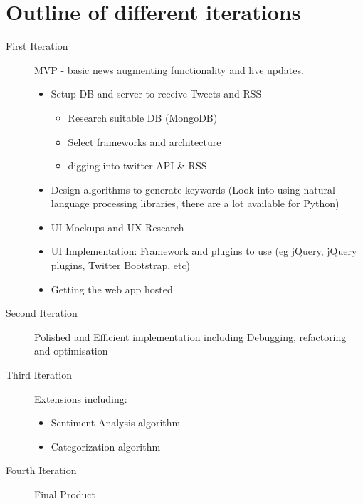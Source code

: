 \documentclass[a4paper,11pt]{article}
\begin{document}
	\section{Outline of different iterations}
	\begin{description}
	  \item[First Iteration] MVP - basic news augmenting functionality and live updates.
	    \begin{itemize}
	      
	      \item Setup DB and server to receive Tweets and RSS
	      
	      \begin{itemize}
	        \item Research suitable DB (MongoDB)
	        \item Select frameworks and architecture
	        \item digging into twitter API \& RSS
	      \end{itemize}
	      
	      \item Design algorithms to generate keywords (Look into using natural language processing libraries, there are a lot available for Python)
	      \item UI Mockups and UX Research
	      \item UI Implementation: Framework and plugins to use (eg jQuery, jQuery plugins, Twitter Bootstrap, etc)
	      \item Getting the web app hosted
	    \end{itemize}
	    \item[Second Iteration] 
	    Polished and Efficient implementation including Debugging, refactoring and optimisation
	    \item[Third Iteration] 
	    Extensions including:
	      \begin{itemize}
	        \item Sentiment Analysis algorithm
	        \item Categorization algorithm    
	      \end{itemize}
	      
	    \item[Fourth Iteration] 
	    Final Product
	  
	  
	\end{description}
	
\end{document}
